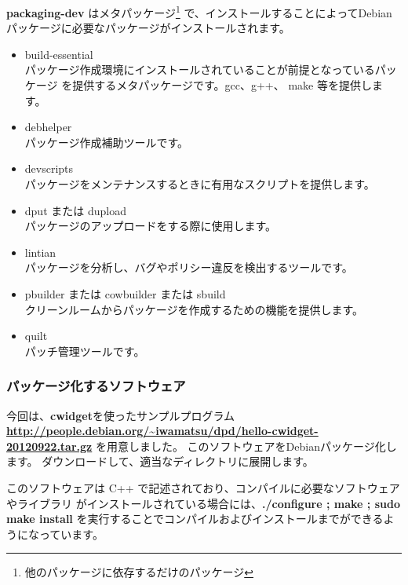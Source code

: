 \documentclass[mingoth,a4paper]{jsarticle}
\begin{document}
{\bf packaging-dev} はメタパッケージ\footnote{他のパッケージに依存するだけのパッケージ}
で、インストールすることによってDebianパッケージに必要なパッケージがインストールされます。

\begin{itemize}
\item build-essential\\
パッケージ作成環境にインストールされていることが前提となっているパッケージ
を提供するメタパッケージです。gcc、g++、 make 等を提供します。
 
\item debhelper\\
パッケージ作成補助ツールです。
\item devscripts\\
パッケージをメンテナンスするときに有用なスクリプトを提供します。
\item dput または dupload\\
パッケージのアップロードをする際に使用します。
\item lintian\\
パッケージを分析し、バグやポリシー違反を検出するツールです。
\item pbuilder または cowbuilder または sbuild\\
クリーンルームからパッケージを作成するための機能を提供します。
\item quilt\\
パッチ管理ツールです。
\end{itemize}

\subsubsection{パッケージ化するソフトウェア}
今回は、{\bf cwidget}を使ったサンプルプログラム
{\bf \url{http://people.debian.org/~iwamatsu/dpd/hello-cwidget-20120922.tar.gz}}
を用意しました。
このソフトウェアをDebianパッケージ化します。
ダウンロードして、適当なディレクトリに展開します。

このソフトウェアは C++ で記述されており、コンパイルに必要なソフトウェアやライブラリ
がインストールされている場合には、{\bf ./configure ; make ; sudo make install} 
を実行することでコンパイルおよびインストールまでができるようになっています。
\end{document}
